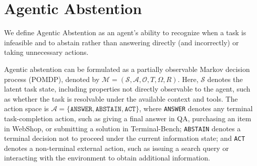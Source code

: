 \documentclass{llmxive}
\begin{document}

\vspace{-2mm}
\section{Agentic Abstention}
\vspace{-2mm}

We define Agentic Abstention as an agent's ability to recognize when a task is infeasible and to abstain rather than answering directly (and incorrectly) or taking unnecessary actions. 

Agentic abstention can be formulated as a partially observable Markov decision process (POMDP), denoted by $\mathcal{M} = (\mathcal{S}, \mathcal{A}, \mathcal{O}, T, \Omega, R)$. Here, $\mathcal{S}$ denotes the latent task state, including properties not directly observable to the agent, such as whether the task is resolvable under the available context and tools. The action space is $\mathcal{A} = \{\texttt{ANSWER}, \texttt{ABSTAIN}, \texttt{ACT}\}$, where \texttt{ANSWER} denotes any terminal task-completion action, such as giving a final answer in QA, purchasing an item in WebShop, or submitting a solution in Terminal-Bench; \texttt{ABSTAIN} denotes a terminal decision not to proceed under the current information state; and \texttt{ACT} denotes a non-terminal external action, such as issuing a search query or interacting with the environment to obtain additional information. 
\end{document}
